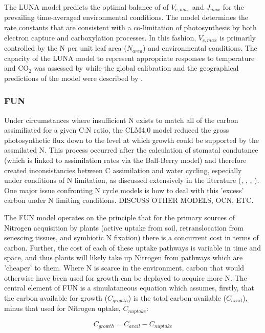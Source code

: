 \documentclass[draft,linenumbers]{agujournal}
\begin{document}
The LUNA model predicts the optimal balance of of $V_{c,max}$ and $J_{max}$ for the prevailing time-averaged environmental conditions.   The model determines the rate constants that are consistent with a co-limitation of photosynthesis by both electron capture and carboxylation processes. In this fashion, $V_{c,max}$ is primarily controlled by the N per unit leaf area ($N_{area}$) and environmental conditions. The capacity of the LUNA model to represent appropriate responses to temperature and CO$_{2}$ was assessed by \cite{xu2012} while the global calibration and the geographical predictions of the model were described by \cite{ali2016}.  

\subsubsection{FUN}
Under circumstances where insufficient N exists to match all of the carbon assimiliated for a given C:N ratio, the CLM4.0 model reduced the gross photosynthetic flux down to the level at which growth could be supported by the assmilated N. This process occurred after the calculation of stomatal condutance (which is linked to assimilation rates via the Ball-Berry model) and therefore created inconsistancies between C assimilation and water cycling, especially under conditions of N limitation, as discussed extensively in the literature (\cite{medlyn2011}, \cite{dekauwe2014}, \cite{walker2014}, \cite{bonan2012}). One major issue confronting N cycle models is how to deal with this 'excess' carbon under N limiting conditions. DISCUSS OTHER MODELS, OCN, ETC. 

The FUN model operates on the principle that for the primary sources of Nitrogen acquisition by plants (active uptake from soil, retranslocation from senescing tissues, and symbiotic N fixation) there is a concurrent cost in terms of carbon. Further, the cost of each of these uptake pathways is variable in time and space, and thus plants will likely take up Nitrogen from pathways which are 'cheaper' to them. Where N is scarce in the environment, carbon that would otherwise have been used for growth can be deployed to acquire more N. The central element of FUN is a simulataneous equation which assumes, firstly, that the carbon available for growth ($C_{growth}$) is the total carbon available ($C_{avail}$), minus that used for Nitrogen uptake, $C_{nuptake}$:

\begin{equation}
C_{growth}=C_{avail}-C_{nuptake}
\end{equation}
\end{document}
